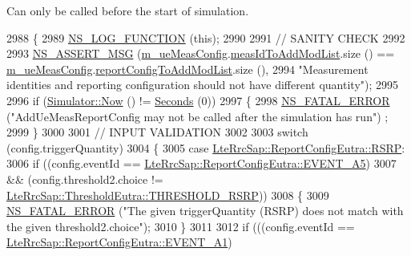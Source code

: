 Can only be called before the start of simulation. 
\begin{DoxyCode}
2988 \{
2989   \hyperlink{log-macros-disabled_8h_a90b90d5bad1f39cb1b64923ea94c0761}{NS\_LOG\_FUNCTION} (\textcolor{keyword}{this});
2990 
2991   \textcolor{comment}{// SANITY CHECK}
2992 
2993   \hyperlink{assert_8h_aff5ece9066c74e681e74999856f08539}{NS\_ASSERT\_MSG} (\hyperlink{classns3_1_1LteEnbRrc_a98d0766aa6a671bb20f2996c634e6b17}{m\_ueMeasConfig}.\hyperlink{structns3_1_1LteRrcSap_1_1MeasConfig_ade3c8b430270fdbc2d1fdd0de3d71b3f}{measIdToAddModList}.size () == 
      \hyperlink{classns3_1_1LteEnbRrc_a98d0766aa6a671bb20f2996c634e6b17}{m\_ueMeasConfig}.\hyperlink{structns3_1_1LteRrcSap_1_1MeasConfig_ac108843a06536367bc3ca19dbd1421da}{reportConfigToAddModList}.size (),
2994                  \textcolor{stringliteral}{"Measurement identities and reporting configuration should not have different quantity"});
2995 
2996   \textcolor{keywordflow}{if} (\hyperlink{classns3_1_1Simulator_ac3178fa975b419f7875e7105be122800}{Simulator::Now} () != \hyperlink{group__timecivil_ga33c34b816f8ff6628e33d5c8e9713b9e}{Seconds} (0))
2997     \{
2998       \hyperlink{group__fatal_ga5131d5e3f75d7d4cbfd706ac456fdc85}{NS\_FATAL\_ERROR} (\textcolor{stringliteral}{"AddUeMeasReportConfig may not be called after the simulation has run"})
      ;
2999     \}
3000 
3001   \textcolor{comment}{// INPUT VALIDATION}
3002 
3003   \textcolor{keywordflow}{switch} (config.triggerQuantity)
3004     \{
3005     \textcolor{keywordflow}{case} \hyperlink{structns3_1_1LteRrcSap_1_1ReportConfigEutra_a82343ddf526faba0483431ea5882a3efa5b7591e86ab7bcefc7fe1528762114d7}{LteRrcSap::ReportConfigEutra::RSRP}:
3006       \textcolor{keywordflow}{if} ((config.eventId == \hyperlink{structns3_1_1LteRrcSap_1_1ReportConfigEutra_ab8152dc095987f60bee2e9115046902fae92d8c286b3b1a6e39edc844df72588c}{LteRrcSap::ReportConfigEutra::EVENT\_A5})
3007           && (config.threshold2.choice != 
      \hyperlink{structns3_1_1LteRrcSap_1_1ThresholdEutra_ad3ed2704b836132980dd2e97cb03822ca0663d5baa9382bd755acb712f6ebf707}{LteRrcSap::ThresholdEutra::THRESHOLD\_RSRP}))
3008         \{
3009           \hyperlink{group__fatal_ga5131d5e3f75d7d4cbfd706ac456fdc85}{NS\_FATAL\_ERROR} (\textcolor{stringliteral}{"The given triggerQuantity (RSRP) does not match with the given
       threshold2.choice"});
3010         \}
3011 
3012       \textcolor{keywordflow}{if} (((config.eventId == \hyperlink{structns3_1_1LteRrcSap_1_1ReportConfigEutra_ab8152dc095987f60bee2e9115046902fa9c0b835cb85601f8a9e424fbf0afab4b}{LteRrcSap::ReportConfigEutra::EVENT\_A1})

\end{DoxyCode}
